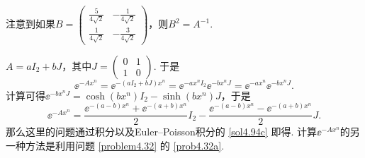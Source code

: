 \begin{solution}
    注意到如果$B=\begin{pmatrix}
        \frac5{4\sqrt2} & - \frac1{4\sqrt2} \\
        \frac1{4\sqrt2} & - \frac3{4\sqrt2}
      \end{pmatrix}$，则$B^2=A^{-1}$.
      
    \begin{inparaenum}[(a)]
      \setcounter{enumi}{1}
      \item $A=aI_2+bJ$，其中$J=\begin{pmatrix}
      0 & 1 \\
      1 & 0
    \end{pmatrix}$. 于是
    \[
      \ee^{-Ax^n} = \ee^{-(aI_2+bJ)x^n} = \ee^{-ax^nI_2}\ee^{-bx^nJ} = \ee^{-ax^n}\ee^{-bx^nJ}.
    \]
    计算可得$\ee^{-bx^nJ}=\cosh(bx^n)I_2-\sinh(bx^n)J$，于是
    \[
      \ee^{-Ax^n} = \frac{\ee^{-(a-b)x^n}+\ee^{-(a+b)x^n}}2I_2 - \frac{\ee^{-(a-b)x^n}-\ee^{-(a+b)x^n}}2J.
    \]
    那么这里的问题通过积分以及Euler--Poisson积分的 \ref{sol4.94c} 即得. 计算$\ee^{-Ax^n}$的另一种方法是利用问题 \ref{problem4.32} 的 \ref{prob4.32a}.
    \end{inparaenum}
\end{solution}

